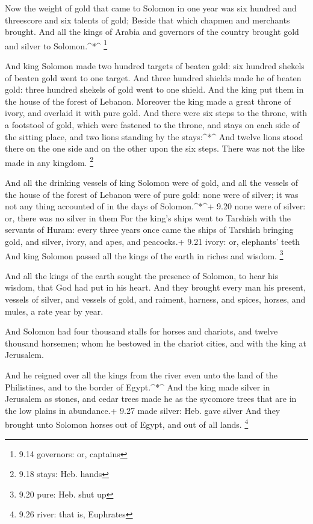  Now the weight of gold that came to Solomon in one year
was six hundred and threescore and six talents of gold; 
Beside that which chapmen and merchants brought. And all the kings of
Arabia and governors of the country brought gold and silver to
Solomon.\^{}*\^{} \footnote{9.14 governors: or, captains}

 And king Solomon made two hundred targets of beaten gold:
six hundred shekels of beaten gold went to one target.  And
three hundred shields made he of beaten gold: three hundred shekels of
gold went to one shield. And the king put them in the house of the
forest of Lebanon.  Moreover the king made a great throne
of ivory, and overlaid it with pure gold.  And there were
six steps to the throne, with a footstool of gold, which were fastened
to the throne, and stays on each side of the sitting place, and two
lions standing by the stays:\^{}*\^{}  And twelve lions
stood there on the one side and on the other upon the six steps. There
was not the like made in any kingdom. \footnote{9.18 stays: Heb. hands}

 And all the drinking vessels of king Solomon were of gold,
and all the vessels of the house of the forest of Lebanon were of pure
gold: none were of silver; it was not any thing accounted of in the days
of Solomon.\^{}*\^{}+ 9.20 none were of silver: or, there was no silver
in them  For the king's ships went to Tarshish with the
servants of Huram: every three years once came the ships of Tarshish
bringing gold, and silver, ivory, and apes, and peacocks.+ 9.21 ivory:
or, elephants' teeth  And king Solomon passed all the kings
of the earth in riches and wisdom. \footnote{9.20 pure: Heb. shut up}

 And all the kings of the earth sought the presence of
Solomon, to hear his wisdom, that God had put in his heart.
 And they brought every man his present, vessels of silver,
and vessels of gold, and raiment, harness, and spices, horses, and
mules, a rate year by year.

 And Solomon had four thousand stalls for horses and
chariots, and twelve thousand horsemen; whom he bestowed in the chariot
cities, and with the king at Jerusalem.

 And he reigned over all the kings from the river even unto
the land of the Philistines, and to the border of Egypt.\^{}*\^{}
 And the king made silver in Jerusalem as stones, and cedar
trees made he as the sycomore trees that are in the low plains in
abundance.+ 9.27 made silver: Heb. gave silver  And they
brought unto Solomon horses out of Egypt, and out of all lands.
\footnote{9.26 river: that is, Euphrates}

